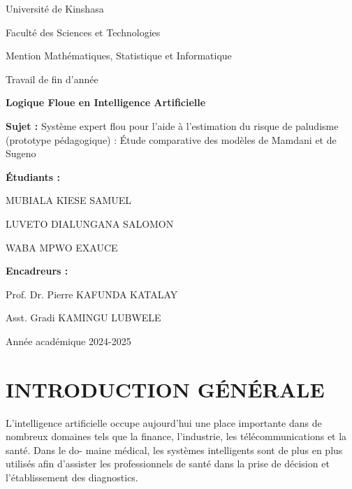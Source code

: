 \documentclass[a4paper,12pt]{report} %
\begin{document}
\begin{titlepage}
\centering
\vspace*{1cm}
{\Large Université de Kinshasa \par}
\vspace{0.5cm}
{\large Faculté des Sciences et Technologies \par}
{\large Mention Mathématiques, Statistique et Informatique \par}
\vspace{0.5cm}
{\Large Travail de fin d'année \par}
\vspace{0.5cm}
{\Large \textbf{Logique Floue en Intelligence Artificielle} \par}
\vspace{0.5cm}
{\Large \textbf{Sujet :} Système expert flou pour l'aide à l'estimation du risque de paludisme (prototype pédagogique) : Étude comparative des modèles de Mamdani et de Sugeno \par}
\vspace{1cm}
{\large \textbf{Étudiants :} \par}
{\large MUBIALA KIESE SAMUEL \par}
{\large LUVETO DIALUNGANA SALOMON \par}
{\large WABA MPWO EXAUCE \par}
\vspace{1cm}
{\large \textbf{Encadreurs :} \par}
{\large Prof. Dr. Pierre KAFUNDA KATALAY \par}
{\large Asst. Gradi KAMINGU LUBWELE \par}
\vfill
{\large Année académique 2024-2025 \par}
\end{titlepage}


\newpage
\section*{INTRODUCTION GÉNÉRALE}

L'intelligence artificielle occupe aujourd'hui une place importante dans de nombreux
domaines tels que la finance, l'industrie, les télécommunications et la santé. Dans le do-
maine médical, les systèmes intelligents sont de plus en plus utilisés afin d'assister les
professionnels de santé dans la prise de décision et l'établissement des diagnostics.
\end{document}
